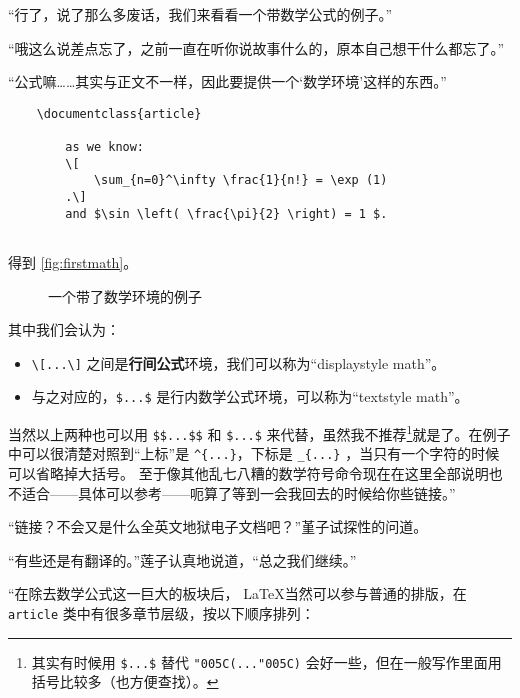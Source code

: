 “行了，说了那么多废话，我们来看看一个带数学公式的例子。”

“哦这么说差点忘了，之前一直在听你说故事什么的，原本自己想干什么都忘了。”

“公式嘛……其实与正文不一样，因此要提供一个‘数学环境’这样的东西。”


\begin{lstlisting}
    \documentclass{article}
    
        as we know:
        \[
            \sum_{n=0}^\infty \frac{1}{n!} = \exp (1)
        .\]
        and $\sin \left( \frac{\pi}{2} \right) = 1 $.
    
\end{lstlisting}

得到 \autoref{fig:firstmath}。

\begin{figure}[th]
    \centering
    \caption{一个带了数学环境的例子}
    \label{fig:firstmath}
\end{figure}


其中我们会认为：
\begin{itemize}
    \item \verb"\[...\]" 之间是\textbf{行间公式}环境，我们可以称为``displaystyle math''。
    \item 与之对应的，\verb"$...$" 是行内数学公式环境，可以称为``textstyle math''。
\end{itemize}

当然以上两种也可以用 \verb"$$...$$" 和 \verb"$...$" 来代替，虽然我不推荐\footnote{其实有时候用 \texttt{\$...\$} 替代 \texttt{\char"005C(...\char"005C)} 会好一些，但在一般写作里面用括号比较多（也方便查找）。}就是了。在例子中可以很清楚对照到“上标”是 \verb"^{...}"，下标是 \verb"_{...}" ，当只有一个字符的时候可以省略掉大括号。 至于像其他乱七八糟的数学符号命令现在在这里全部说明也不适合——具体可以参考——呃算了等到一会我回去的时候给你些链接。”

“链接？不会又是什么全英文地狱电子文档吧？”堇子试探性的问道。

“有些还是有翻译的。”莲子认真地说道，“总之我们继续。”

“在除去数学公式这一巨大的板块后， \LaTeX 当然可以参与普通的排版，在 \verb"article" 类中有很多章节层级，按以下顺序排列：

